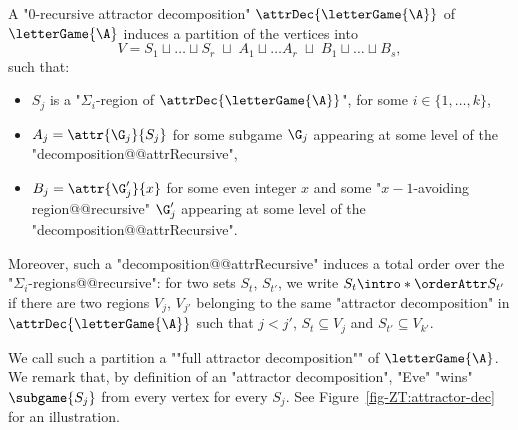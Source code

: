\documentclass[10pt,a4paper]{amsart}
\renewcommand{\SS}{\Sigma}
\begin{document}
\begin{remark}\label{rmk-ZT:full-attractor-decomposition}
	A "$0$-recursive attractor decomposition" $\attrDec{\letterGame{\A}}$ of $\letterGame{\A}$ induces a partition of the vertices into
	\[ V = S_1 \sqcup \dots \sqcup S_r \; \sqcup \; A_1\sqcup\dots A_r \; \sqcup \;  B_1\sqcup \dots \sqcup B_s,  \]
	such that:
	\begin{itemize}
		\item $S_j$ is a "$\SS_i$-region of $\attrDec{\letterGame{\A}}$", for some $i\in \{1,\dots, k\}$,
		\item $A_j = \attr{\G_j}{S_j}$ for some subgame $\G_j$ appearing at some level of the "decomposition@@attrRecursive",
		\item $B_j = \attr{\G_j'}{x}$ for some even integer $x$ and some "$x-1$-avoiding region@@recursive" $\G_j'$  appearing at some level of the "decomposition@@attrRecursive".
	\end{itemize}

\AP Moreover, such a "decomposition@@attrRecursive" induces a total order over the "$\SS_i$-regions@@recursive": for two sets $S_t$, $S_{t'}$, we write $S_t \intro*\orderAttr S_{t'}$ if there are two regions $V_j$, $V_{j'}$ belonging to the same "attractor decomposition" in $\attrDec{\letterGame{\A}}$ such that $j<j'$, $S_t\subseteq V_j$ and $S_{t'}\subseteq V_{k'}$.

\AP We call such a partition a ""full attractor decomposition"" of $\letterGame{\A}$. We remark that, by definition of an "attractor decomposition", "Eve" "wins" $\subgame{S_j}$ from every vertex for every $S_j$.
See Figure~\ref{fig-ZT:attractor-dec} for an illustration.
\end{remark}
\end{document}
